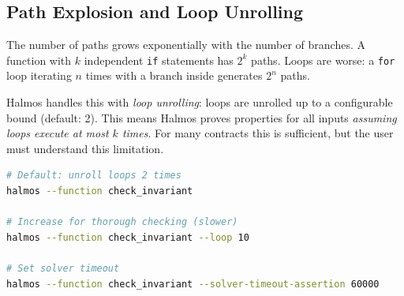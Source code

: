 \subsection{Path Explosion and Loop Unrolling}

The number of paths grows exponentially with the number of branches. A function with
$k$ independent \texttt{if} statements has $2^k$ paths. Loops are worse: a \texttt{for}
loop iterating $n$ times with a branch inside generates $2^n$ paths.

Halmos handles this with \emph{loop unrolling}: loops are unrolled up to a configurable
bound (default: 2). This means Halmos proves properties for all inputs \emph{assuming
loops execute at most $k$ times}. For many contracts this is sufficient, but the user
must understand this limitation.

\begin{lstlisting}[language=bash,caption={Running Halmos with loop bounds}]
# Default: unroll loops 2 times
halmos --function check_invariant

# Increase for thorough checking (slower)
halmos --function check_invariant --loop 10

# Set solver timeout
halmos --function check_invariant --solver-timeout-assertion 60000
\end{lstlisting}

